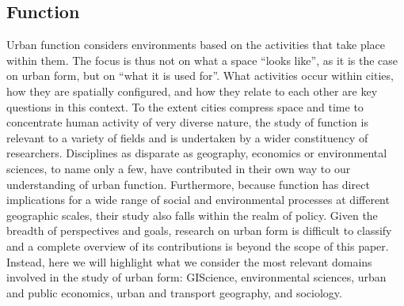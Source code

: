 \subsection{Function}
\label{sec:lit_function}


Urban function considers environments based on the activities that take place
within them.
%
The focus is thus not on what a space ``looks
like'', as it is the case on urban form, but on ``what it is used for''. What
activities occur within cities, how they are spatially configured, and how
they relate to each other are key questions in this context.
%
To the extent cities compress space and time to concentrate human activity of
very diverse nature, the study of function is relevant to a variety of
fields and is undertaken by a wider constituency of researchers. Disciplines
as disparate as geography, economics or environmental sciences, to name only a
few, have contributed in their own way to our understanding of urban
function.
Furthermore, because function has direct implications for a wide range of
social and environmental processes at different geographic scales, their study
also falls within the realm of policy.
%
Given the breadth of perspectives and goals, research on urban form is
difficult to classify and a complete overview of its contributions is beyond
the scope of this paper. Instead, here we will highlight what we consider the
most relevant domains involved in the study of urban form: GIScience,
environmental sciences, urban and public economics, urban and transport
geography, and sociology.


